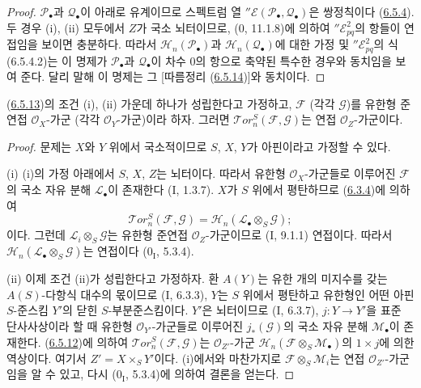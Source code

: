 \begin{proof}
$\mathscr P_\bullet$과 $\mathscr Q_\bullet$이 아래로 유계이므로
스펙트럼 열
$''\mathscr E(\mathscr P_\bullet,\mathscr Q_\bullet)$은 쌍정칙이다
(\hyperref[III.6.5.4-fr]{6.5.4}). 두 경우 (i), (ii) 모두에서 $Z$가
국소 뇌터이므로, (0, 11.1.8)에 의하여 $''\mathscr E_{pq}^2$의 항들이
연접임을 보이면 충분하다. 따라서
$\mathscr H_n(\mathscr P_\bullet)$과
$\mathscr H_n(\mathscr Q_\bullet)$에 대한 가정 및
$''\mathscr E_{pq}^2$의 식 (6.5.4.2)는 이 명제가
$\mathscr P_\bullet$과 $\mathscr Q_\bullet$이 차수 0의 항으로 축약된
특수한 경우와 동치임을 보여 준다. 달리 말해 이 명제는 그
[따름정리 (\hyperref[III.6.5.14-fr]{6.5.14})]와 동치이다.
\end{proof}

\begin{corollary}[6.5.14]
\label{III.6.5.14-fr}
(\hyperref[III.6.5.13-fr]{6.5.13})의 조건 (i), (ii) 가운데 하나가
성립한다고 가정하고, $\mathscr F$ (각각 $\mathscr G$)를 유한형
준연접 $\mathscr O_X$-가군 (각각 $\mathscr O_Y$-가군)이라 하자.
그러면 $\mathscr{T}\!or_n^S(\mathscr F,\mathscr G)$는 연접
$\mathscr O_Z$-가군이다.
\end{corollary}

\begin{proof}
문제는 $X$와 $Y$ 위에서 국소적이므로 $S$, $X$, $Y$가 아핀이라고
가정할 수 있다.

\textnormal{(i)} (i)의 가정 아래에서 $S$, $X$, $Z$는 뇌터이다.
따라서 유한형 $\mathscr O_X$-가군들로 이루어진 $\mathscr F$의
국소 자유 분해 $\mathscr L_\bullet$이 존재한다 (I, 1.3.7). $X$가
$S$ 위에서 평탄하므로 (\hyperref[III.6.3.4-fr]{6.3.4})에 의하여
\[
  \mathscr{T}\!or_n^S(\mathscr F,\mathscr G)
  =\mathscr H_n(\mathscr L_\bullet\otimes_S\mathscr G);
\]
이다. 그런데 $\mathscr L_i\otimes_S\mathscr G$는 유한형 준연접
$\mathscr O_Z$-가군이므로 (I, 9.1.1) 연접이다. 따라서
$\mathscr H_n(\mathscr L_\bullet\otimes_S\mathscr G)$는 연접이다
($0_{\mathrm I}$, 5.3.4).

\textnormal{(ii)} 이제 조건 (ii)가 성립한다고 가정하자. 환 $A(Y)$는
유한 개의 미지수를 갖는 $A(S)$-다항식 대수의 몫이므로 (I, 6.3.3),
$Y$는 $S$ 위에서 평탄하고 유한형인 어떤 아핀 $S$-준스킴 $Y'$의
닫힌 $S$-부분준스킴이다. $Y'$은 뇌터이므로 (I, 6.3.7),
$j:Y\to Y'$을 표준 단사사상이라 할 때 유한형
$\mathscr O_{Y'}$-가군들로 이루어진 $j_*(\mathscr G)$의 국소 자유
분해 $\mathscr M_\bullet$이 존재한다. (\hyperref[III.6.5.12-fr]{6.5.12})에
의하여 $\mathscr{T}\!or_n^S(\mathscr F,\mathscr G)$는
$\mathscr O_{Z'}$-가군
$\mathscr H_n(\mathscr F\otimes_S\mathscr M_\bullet)$의
$1\times j$에 의한 역상이다. 여기서 $Z'=X\times_S Y'$이다. (i)에서와
마찬가지로 $\mathscr F\otimes_S\mathscr M_i$는 연접
$\mathscr O_{Z'}$-가군임을 알 수 있고, 다시
($0_{\mathrm I}$, 5.3.4)에 의하여 결론을 얻는다.
\end{proof}

